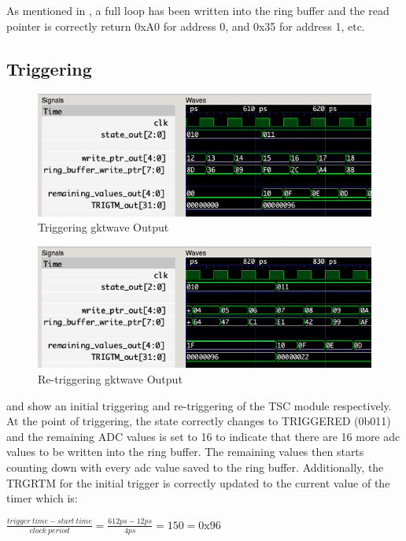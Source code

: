 As mentioned in , a full loop has been written into the ring buffer and the read pointer is correctly return 0xA0 for address 0, and 0x35 for address 1, etc.

\subsection{Triggering}
\begin{figure}[H]
    \centering
    \includegraphics[width=\columnwidth]{Figures/Dtriggered}
    \caption{Triggering gktwave Output}
    \label{fig:testD}
\end{figure}
\begin{figure}[H]
    \centering
    \includegraphics[width=\columnwidth]{Figures/Dtriggered2}
    \caption{Re-triggering gktwave Output}
    \label{fig:testD2}
\end{figure}

 and  show an initial triggering and re-triggering of the TSC module respectively.
At the point of triggering, the state correctly changes to TRIGGERED (0b011) and the remaining ADC values is set to 16 to indicate that there are 16 more adc values to be written into the ring buffer.
The remaining values then starts counting down with every adc value saved to the ring buffer.
Additionally, the TRGRTM for the initial trigger is correctly updated to the current value of the timer which is:

$\frac{trigger\ time - start\ time}{clock\ period} = \frac{612ps - 12ps }{4ps} = 150 = \mathrm{0x96}$

